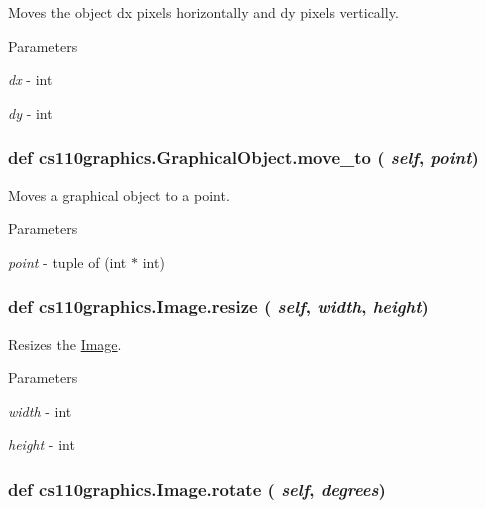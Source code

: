 Moves the object dx pixels horizontally and dy pixels vertically. 
\begin{DoxyParams}{Parameters}
\item[{\em dx}]-\/ int \item[{\em dy}]-\/ int \end{DoxyParams}
\hypertarget{classcs110graphics_1_1GraphicalObject_abe2d480265df7ac9447205c52c6946df}{
\subsubsection[{move\_\-to}]{\setlength{\rightskip}{0pt plus 5cm}def cs110graphics.GraphicalObject.move\_\-to ( {\em self}, \/   {\em point})}}
\label{classcs110graphics_1_1GraphicalObject_abe2d480265df7ac9447205c52c6946df}


Moves a graphical object to a point. 
\begin{DoxyParams}{Parameters}
\item[{\em point}]-\/ tuple of (int $\ast$ int) \end{DoxyParams}
\hypertarget{classcs110graphics_1_1Image_a0754151035bb2892f0cd3895b64488fa}{
\subsubsection[{resize}]{\setlength{\rightskip}{0pt plus 5cm}def cs110graphics.Image.resize ( {\em self}, \/   {\em width}, \/   {\em height})}}
\label{classcs110graphics_1_1Image_a0754151035bb2892f0cd3895b64488fa}


Resizes the \hyperlink{classcs110graphics_1_1Image}{Image}. 
\begin{DoxyParams}{Parameters}
\item[{\em width}]-\/ int \item[{\em height}]-\/ int \end{DoxyParams}
\hypertarget{classcs110graphics_1_1Image_ac58717d68279e536cee608e2bdfc6aa8}{
\subsubsection[{rotate}]{\setlength{\rightskip}{0pt plus 5cm}def cs110graphics.Image.rotate ( {\em self}, \/   {\em degrees})}}
\label{classcs110graphics_1_1Image_ac58717d68279e536cee608e2bdfc6aa8}


